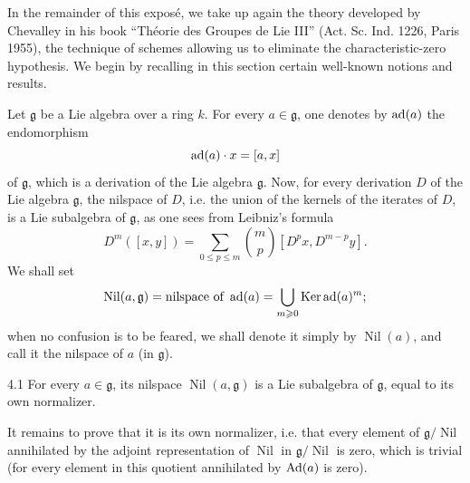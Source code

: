 In the remainder of this expos\'e, we take up again the theory developed
by Chevalley in his book ``Th\'eorie des Groupes de Lie III'' (Act. Sc.
Ind. 1226, Paris 1955), the technique of schemes allowing us to eliminate
the characteristic-zero hypothesis. We begin by recalling in this
section certain well-known notions and results.

Let $\mathfrak g$ be a Lie algebra over a ring $k$. For every
$a\in\mathfrak g$, one denotes by $\operatorname{ad}(a)$ the endomorphism
\[
 \operatorname{ad}(a)\cdot x=[a,x]
\]
of $\mathfrak g$, which is a derivation of the Lie algebra $\mathfrak g$.
Now, for every derivation $D$ of the Lie algebra $\mathfrak g$, the
nilspace of $D$, i.e. the union of the kernels of the iterates of $D$,
is a Lie subalgebra of $\mathfrak g$, as one sees from Leibniz's formula
\[
 D^m([x,y])=\sum_{0\leq p\leq m}\binom{m}{p}[D^px,D^{m-p}y].
\]
We shall set
\[
 \operatorname{Nil}(a,\mathfrak g)=\text{nilspace of }\operatorname{ad}(a)
 =\bigcup_{m\geqslant0}\operatorname{Ker}\operatorname{ad}(a)^m;
\]
when no confusion is to be feared, we shall denote it simply by
$\operatorname{Nil}(a)$, and call it the nilspace of $a$ (in $\mathfrak g$).

\begin{proposition}{4.1}\label{XIII.4.1}
For every $a\in\mathfrak g$, its nilspace $\operatorname{Nil}(a,\mathfrak g)$
is a Lie subalgebra of $\mathfrak g$, equal to its own normalizer.
\end{proposition}
It remains to prove that it is its own normalizer, i.e. that every
element of $\mathfrak g/\operatorname{Nil}$ annihilated by the adjoint
representation of $\operatorname{Nil}$ in
$\mathfrak g/\operatorname{Nil}$ is zero, which is trivial (for every
element in this quotient annihilated by $\operatorname{Ad}(a)$ is zero).

